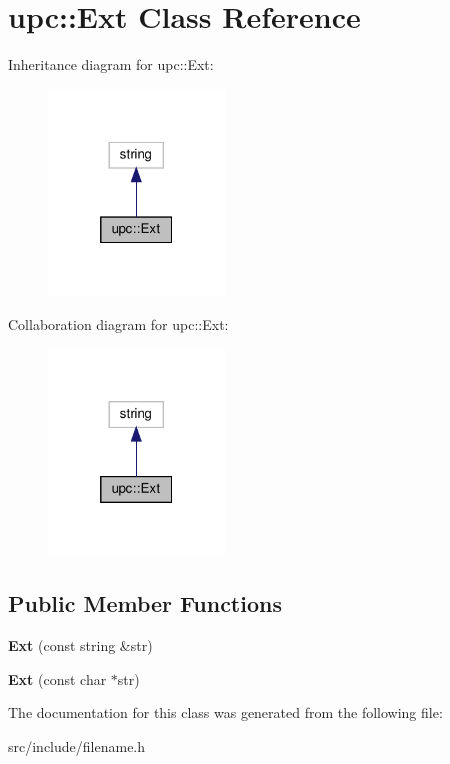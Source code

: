\hypertarget{classupc_1_1Ext}{}\section{upc\+:\+:Ext Class Reference}
\label{classupc_1_1Ext}


Inheritance diagram for upc\+:\+:Ext\+:
\nopagebreak
\begin{figure}[H]
\begin{center}
\leavevmode
\includegraphics[width=133pt]{classupc_1_1Ext__inherit__graph}
\end{center}
\end{figure}


Collaboration diagram for upc\+:\+:Ext\+:
\nopagebreak
\begin{figure}[H]
\begin{center}
\leavevmode
\includegraphics[width=133pt]{classupc_1_1Ext__coll__graph}
\end{center}
\end{figure}
\subsection*{Public Member Functions}
\begin{DoxyCompactItemize}
\item 
\mbox{\label{classupc_1_1Ext_af9636b92ecb5e6f5d0f16ae4d968c21a}} 
{\bfseries Ext} (const string \&str)
\item 
\mbox{\label{classupc_1_1Ext_a0e3b4b899d14b0bef3dbf566a38086ae}} 
{\bfseries Ext} (const char $\ast$str)
\end{DoxyCompactItemize}


The documentation for this class was generated from the following file\+:\begin{DoxyCompactItemize}
\item 
src/include/filename.\+h\end{DoxyCompactItemize}
